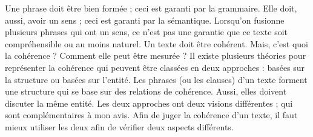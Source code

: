 \documentclass{KodeBook}
\begin{document}
\begin{discussion}
Une phrase doit être bien formée ; ceci est garanti par la grammaire. 
Elle doit, aussi, avoir un sens ; ceci est garanti par la sémantique. 
Lorsqu'on fusionne plusieurs phrases qui ont un sens, ce n'est pas une garantie que ce texte soit compréhensible ou au moins naturel. 
Un texte doit être cohérent. 
Mais, c'est quoi la cohérence ? Comment elle peut être mesurée ?
Il existe plusieurs théories pour représenter la cohérence qui peuvent être classées en deux approches : basées sur la structure ou basées sur l'entité. 
Les phrases (ou les clauses) d'un texte forment une structure qui se base sur des relations de cohérence. 
Aussi, elles doivent discuter la même entité.
Les deux approches ont deux visions différentes ; qui sont complémentaires à mon avis. 
Afin de juger la cohérence d'un texte, il faut mieux utiliser les deux afin de vérifier deux aspects différents.

\end{discussion}

\ifx\wholebook\relax\else
% 
% 
	
\end{document}
